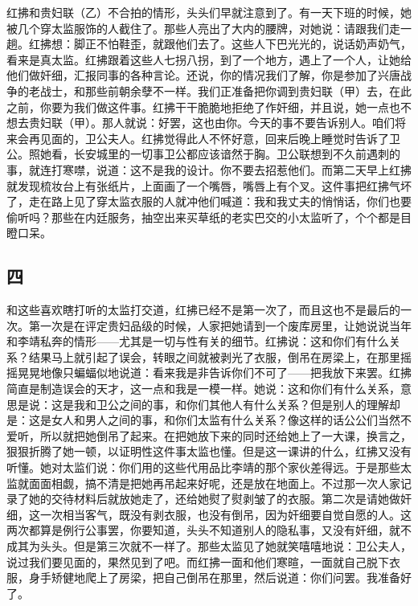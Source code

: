 红拂和贵妇联（乙）不合拍的情形，头头们早就注意到了。有一天下班的时候，她被几个穿太监服饰的人截住了。那些人亮出了大内的腰牌，对她说：请跟我们走一趟。红拂想：脚正不怕鞋歪，就跟他们去了。这些人下巴光光的，说话奶声奶气，看来是真太监。红拂跟着这些人七拐八拐，到了一个地方，遇上了一个人，让她给他们做奸细，汇报同事的各种言论。还说，你的情况我们了解，你是参加了兴唐战争的老战士，和那些前朝余孽不一样。我们正准备把你调到贵妇联（甲）去，在此之前，你要为我们做这件事。红拂干干脆脆地拒绝了作奸细，并且说，她一点也不想去贵妇联（甲）。那人就说：好罢，这也由你。今天的事不要告诉别人。咱们将来会再见面的，卫公夫人。红拂觉得此人不怀好意，回来后晚上睡觉时告诉了卫公。照她看，长安城里的一切事卫公都应该谙然于胸。卫公联想到不久前遇刺的事，就连打寒噤，说道：这不是我的设计。你不要去招惹他们。而第二天早上红拂就发现梳妆台上有张纸片，上面画了一个嘴唇，嘴唇上有个叉。这件事把红拂气坏了，走在路上见了穿太监衣服的人就冲他们喊道：我和我丈夫的悄悄话，你们也要偷听吗？那些在内廷服务，抽空出来买草纸的老实巴交的小太监听了，个个都是目瞪口呆。 

\subsection{四} 

和这些喜欢瞎打听的太监打交道，红拂已经不是第一次了，而且这也不是最后的一次。第一次是在评定贵妇品级的时候，人家把她请到一个废库房里，让她说说当年和李靖私奔的情形——尤其是一切与性有关的细节。红拂说：这和你们有什么关系？结果马上就引起了误会，转眼之间就被剥光了衣服，倒吊在房梁上，在那里摇摇晃晃地像只蝙蝠似地说道：看来我是非告诉你们不可了——把我放下来罢。红拂简直是制造误会的天才，这一点和我是一模一样。她说：这和你们有什么关系，意思是说：这是我和卫公之间的事，和你们其他人有什么关系？但是别人的理解却是：这是女人和男人之间的事，和你们太监有什么关系？像这样的话公公们当然不爱听，所以就把她倒吊了起来。在把她放下来的同时还给她上了一大课，换言之，狠狠折腾了她一顿，以证明性这件事太监也懂。但是这一课讲的什么，红拂又没有听懂。她对太监们说：你们用的这些代用品比李靖的那个家伙差得远。于是那些太监就面面相觑，搞不清是把她再吊起来好呢，还是放在地面上。不过那一次人家记录了她的交待材料后就放她走了，还给她熨了熨剥皱了的衣服。第二次是请她做奸细，这一次相当客气，既没有剥衣服，也没有倒吊，因为奸细要自觉自愿的人。这两次都算是例行公事罢，你要知道，头头不知道别人的隐私事，又没有奸细，就不成其为头头。但是第三次就不一样了。那些太监见了她就笑嘻嘻地说：卫公夫人，说过我们要见面的，果然见到了吧。而红拂一面和他们寒暄，一面就自己脱下衣服，身手矫健地爬上了房梁，把自己倒吊在那里，然后说道：你们问罢。我准备好了。 

